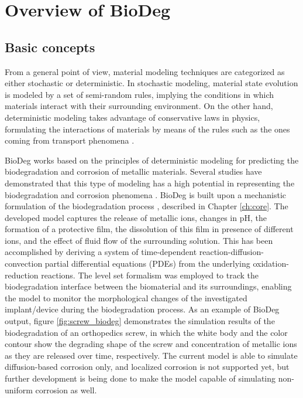 \section{Overview of BioDeg}

\subsection{Basic concepts}

From a general point of view, material modeling techniques are categorized as either stochastic or deterministic. In stochastic modeling, material state evolution is modeled by a set of semi-random rules, implying the conditions in which materials interact with their surrounding environment. On the other hand, deterministic modeling takes advantage of conservative laws in physics, formulating the interactions of materials by means of the rules such as the ones coming from transport phenomena \cite{Kurtz1972}.

BioDeg works based on the principles of deterministic modeling for predicting the biodegradation and corrosion of metallic materials. Several studies have demonstrated that this type of modeling has a high potential in representing the biodegradation and corrosion phenomena \cite{Dolgikh2019, Bajger2016, SanzHerrera2018}. BioDeg is built upon a mechanistic formulation of the biodegradation process \cite{Barzegari2021}, described in Chapter \ref{ch:core}. The developed model captures the release of metallic ions, changes in pH, the formation of a protective film, the dissolution of this film in presence of different ions, and the effect of fluid flow of the surrounding solution. This has been accomplished by deriving a system of time-dependent reaction-diffusion-convection partial differential equations ({PDE}s) from the underlying oxidation-reduction reactions. The level set formalism \cite{RonaldFedkiw2002} was employed to track the biodegradation interface between the biomaterial and its surroundings, enabling the model to monitor the morphological changes of the investigated implant/device during the biodegradation process. As an example of BioDeg output, figure \ref{fig:screw_biodeg} demonstrates the simulation results of the biodegradation of an orthopedics screw, in which the white body and the color contour show the degrading shape of the screw and concentration of metallic ions as they are released over time, respectively. The current model is able to simulate diffusion-based corrosion only, and localized corrosion is not supported yet, but further development is being done to make the model capable of simulating non-uniform corrosion as well.

